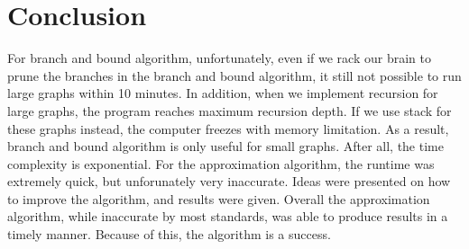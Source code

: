 \section{Conclusion}
For branch and bound algorithm, unfortunately, even if we rack our brain to prune the branches in the branch and bound algorithm, it still not possible to run large graphs within 10 minutes. In addition, when we implement recursion for large graphs, the program reaches maximum recursion depth. If we use stack for these graphs instead, the computer freezes with memory limitation. As a result, branch and bound algorithm is only useful for small graphs. After all, the time complexity is exponential.
For the approximation algorithm, the runtime was extremely quick, but unforunately very inaccurate. Ideas were presented on how to improve the algorithm, and results were given. Overall the approximation algorithm, while inaccurate by most standards, was able to produce results in a timely manner. Because of this, the algorithm is a success. 

\nocite{*}


